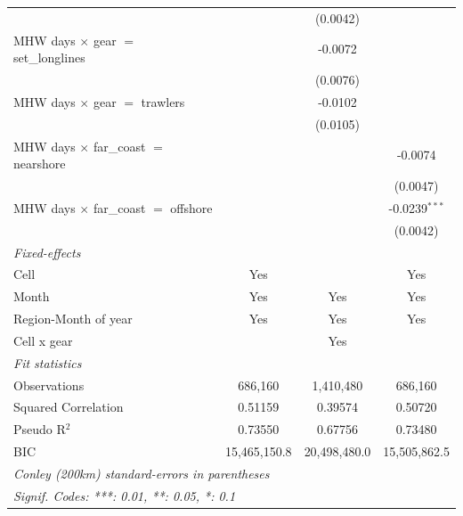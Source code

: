 \begin{table}[htbp]
\begin{tabular}{lccc}
                                                       &                 & (0.0042)        &   \\   
      MHW days $\times$ gear $=$ set\_longlines        &                 & -0.0072         &   \\   
                                                       &                 & (0.0076)        &   \\   
      MHW days $\times$ gear $=$ trawlers              &                 & -0.0102         &   \\   
                                                       &                 & (0.0105)        &   \\   
      MHW days $\times$ far\_coast $=$ nearshore       &                 &                 & -0.0074\\   
                                                       &                 &                 & (0.0047)\\   
      MHW days $\times$ far\_coast $=$ offshore        &                 &                 & -0.0239$^{***}$\\   
                                                       &                 &                 & (0.0042)\\   
      \midrule
      \emph{Fixed-effects}\\
      Cell                                             & Yes             &                 & Yes\\  
      Month                                            & Yes             & Yes             & Yes\\  
      Region-Month of year                             & Yes             & Yes             & Yes\\  
      Cell x gear                                      &                 & Yes             & \\  
      \midrule
      \emph{Fit statistics}\\
      Observations                                     & 686,160         & 1,410,480       & 686,160\\  
      Squared Correlation                              & 0.51159         & 0.39574         & 0.50720\\  
      Pseudo R$^2$                                     & 0.73550         & 0.67756         & 0.73480\\  
      BIC                                              & 15,465,150.8    & 20,498,480.0    & 15,505,862.5\\  
      \midrule \midrule
      \multicolumn{4}{l}{\emph{Conley (200km) standard-errors in parentheses}}\\
      \multicolumn{4}{l}{\emph{Signif. Codes: ***: 0.01, **: 0.05, *: 0.1}}\\
   \end{tabular}
\end{table}


